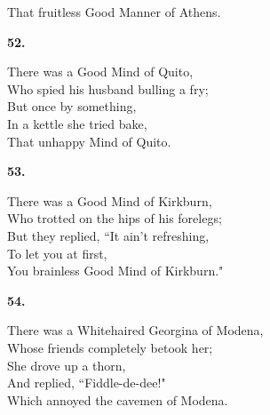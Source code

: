 \documentclass{book}
\begin{document}
{\hspace*{14mm}       That fruitless Good Manner of Athens.
\begin{center}
\textbf{    52.}
\end{center}
\par
\noindent
\hspace*{14mm}       There was a Good Mind of Quito, \\
\hspace*{14mm}       Who spied his husband bulling a fry; \\
\hspace*{14mm}       But once by something, \\
\hspace*{14mm}       In a kettle she tried bake, \\
\hspace*{14mm}       That unhappy Mind of Quito.
\begin{center}
\textbf{    53.}
\end{center}
\par
\noindent
\hspace*{14mm}       There was a Good Mind of Kirkburn, \\
\hspace*{14mm}       Who trotted on the hips of his forelegs; \\
\hspace*{14mm}       But they replied, ``It ain't refreshing, \\
\hspace*{14mm}       To let you at first, \\
\hspace*{14mm}       You brainless Good Mind of Kirkburn."
\begin{center}
\textbf{    54.}
\end{center}
\par
\noindent
\hspace*{14mm}       There was a Whitehaired Georgina of Modena, \\
\hspace*{14mm}       Whose friends completely betook her; \\
\hspace*{14mm}       She drove up a thorn, \\
\hspace*{14mm}       And replied, ``Fiddle-de-dee!" \\
\hspace*{14mm}       Which annoyed the cavemen of Modena.
\begin{center}

\end{center}}
\end{document}
